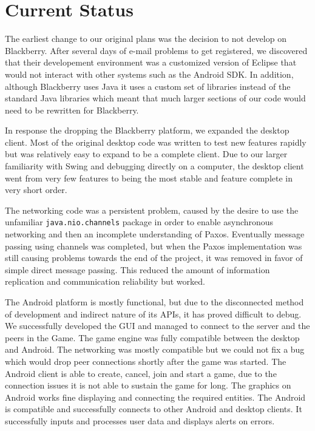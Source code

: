 \documentclass{sig-alternate}
\begin{document}
\section{Current Status}
\label{status}

The earliest change to our original plans was the decision to not develop
on Blackberry.  After several days of e-mail problems to get registered, we
discovered that their developement environment was a customized version of
Eclipse that would not interact with other systems such as the Android SDK.
In addition, although Blackberry uses Java it uses a custom set of
libraries instead of the standard Java libraries which meant that much
larger sections of our code would need to be rewritten for Blackberry.

In response the dropping the Blackberry platform, we expanded the desktop
client.  Most of the original desktop code was written to test new features
rapidly but was relatively easy to expand to be a complete client.  Due to
our larger familiarity with Swing and debugging directly on a computer, the
desktop client went from very few features to being the most stable and
feature complete in very short order.

The networking code was a persistent problem, caused by the desire to use
the unfamiliar \texttt{java.nio.channels} package in order to enable
asynchronous networking and then an incomplete understanding of Paxos.
Eventually message passing using channels was completed, but when the Paxos
implementation was still causing problems towards the end of the project,
it was removed in favor of simple direct message passing.  This reduced the
amount of information replication and communication reliability but worked.

The Android platform is mostly functional, but due to the disconnected
method of development and indirect nature of its APIs, it has proved
difficult to debug.  We successfully developed the GUI and managed to
connect to the server and the peers in the Game.  The game engine was fully
compatible between the desktop and Android.  The networking was mostly
compatible but we could not fix a bug which would drop peer connections
shortly after the game was started.  The Android client is able to create,
cancel, join and start a game, due to the connection issues it is not able
to sustain the game for long.  The graphics on Android works fine
displaying and connecting the required entities.  The Android is compatible
and successfully connects to other Android and desktop clients.  It
successfully inputs and processes user data and displays alerts on errors.
\end{document}
